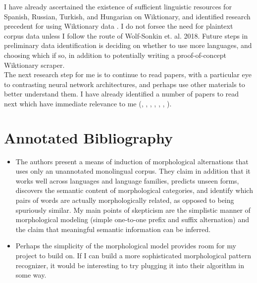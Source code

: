 \documentclass[12pt]{report}
\begin{document}
I have already ascertained the existence of sufficient linguistic resources for Spanish, Russian, Turkish, and Hungarian on Wiktionary, and identified research precedent for using Wiktionary data \cite{Cotterell2016}. I do not forsee the need for plaintext corpus data unless I follow the route of Wolf-Sonkin et. al. 2018. Future steps in preliminary data identification is deciding on whether to use more languages, and choosing which if so, in addition to potentially writing a proof-of-concept Wiktionary scraper. \\

The next research step for me is to continue to read papers, with a particular eye to contrasting neural network architectures, and perhaps use other materials to better understand them. I have already identified a number of papers to read next which have immediate relevance to me (\cite{Alexandrescu2006}, \cite{Cotterell2017}, \cite{Gomez2017}, \cite{WolfSonkin2018}, \cite{Cotterell2018}, \cite{Cotterell2018a}, \cite{Luong2013}). \\

\newpage

\section*{Annotated Bibliography}


\begin{itemize}
	
	\item The authors present a means of induction of morphological alternations that uses only an unannotated monolingual corpus. They claim in addition that it works well across languages and language families, predicts unseen forms, discovers the semantic content of morphological categories, and identify which pairs of words are actually morphologically related, as opposed to being spuriously similar. My main points of skepticism are the simplistic manner of morphological modeling (simple one-to-one prefix and suffix alternation) and the claim that meaningful semantic information can be inferred.
	
	\item Perhaps the simplicity of the morphological model provides room for my project to build on. If I can build a more sophisticated morphological pattern recognizer, it would be interesting to try plugging it into their algorithm in some way.
	
\end{itemize}
\end{document}
